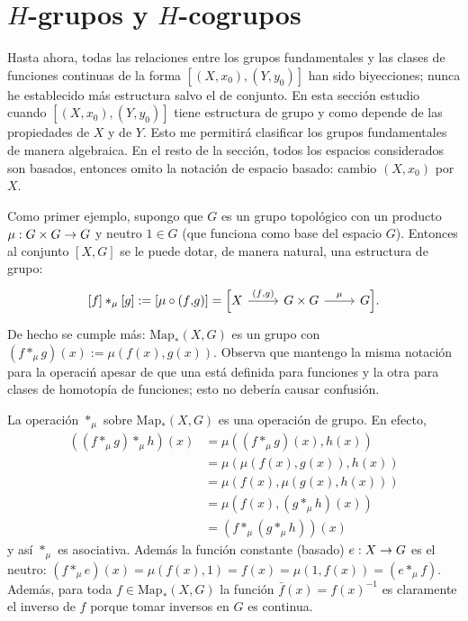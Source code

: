 \documentclass[../../topologia_algebraica]{subfiles}
\begin{document}
\section{$H$-grupos y $H$-cogrupos}

Hasta ahora, todas las relaciones entre los grupos fundamentales y las clases de funciones continuas
de la forma $[(X,x_0),(Y,y_0)]$ han sido biyecciones; nunca he establecido m\'as estructura salvo
el de conjunto. En esta secci\'on estudio cuando $[(X,x_0),(Y,y_0)]$ tiene estructura de grupo y
como depende de las propiedades de $X$ y de $Y$. Esto me permitir\'a clasificar los grupos
fundamentales de manera algebraica. En el resto de la secci\'on, todos los espacios considerados
son basados, entonces omito la notaci\'on de espacio basado: cambio $(X,x_0)$ por $X$.

Como primer ejemplo, supongo que $G$ es un grupo topol\'ogico con un producto $\mu:G\times G\rightarrow G$
y neutro $1\in G$ (que funciona como base del espacio $G$). Entonces al conjunto $[X,G]$ se le puede
dotar, de manera natural, una estructura de grupo:
\[
  \begin{tikzcd}
    \text{[}f\text{]}*_{\mu}\text{[}g\text{]}:=
    \text{[}\mu\circ(f\text{,}g)\text{]}=
    \Big[ X \arrow[r,"(f\text{,}g)"] & G\times G \arrow[r,"\mu"] & G \Big].
  \end{tikzcd}
\]
De hecho se cumple m\'as: $\text{Map}_*(X,G)$ es un grupo con $(f*_{\mu}g)(x):=\mu(f(x),g(x))$.
Observa que mantengo la misma notaci\'on para la operaci\'n apesar de que una est\'a definida
para funciones y la otra para clases de homotop\'ia de funciones;
esto no deber\'ia causar confusi\'on. 

La operaci\'on $*_{\mu}$ sobre $\text{Map}_*(X,G)$ es una operaci\'on de grupo. En efecto,
\begin{align*}
  ((f*_{\mu}g)*_{\mu}h)(x) &=
  \mu((f*_{\mu}g)(x),h(x))\\ & =
  \mu(\mu(f(x),g(x)),h(x))\\ & =
  \mu(f(x),\mu(g(x),h(x)))\\ & =
  \mu(f(x),(g*_{\mu}h)(x))\\ &=
  (f*_{\mu}(g*_{\mu}h))(x)
\end{align*}
y as\'i $*_{\mu}$ es asociativa. Adem\'as  la funci\'on constante (basado) $e:X\rightarrow G$ es el neutro:
$(f*_{\mu}e)(x)=\mu(f(x),1)=f(x)=\mu(1,f(x))=(e*_{\mu}f)$. Adem\'as, para toda $f\in\text{Map}_*(X,G)$
la funci\'on $\bar{f}(x)=f(x)^{-1}$ es claramente el inverso de $f$ porque tomar inversos en $G$ es
continua.
\end{document}
